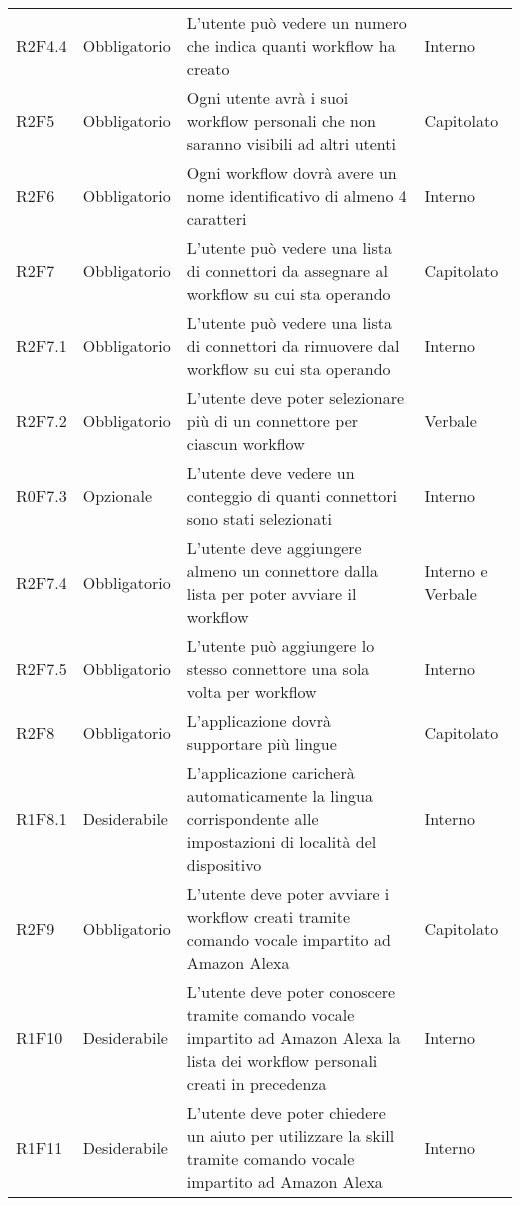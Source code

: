 \begin{center}
\begin{longtable}{  >{\RaggedRight}p{2.5cm}  
						>{\RaggedRight}p{2.1cm} 
						>{\RaggedRight}p{7cm}  
						>{\RaggedRight}p{1.7cm} 
						}
		R2F4.4 & Obbligatorio & L'utente può vedere un numero che indica quanti workflow ha creato                                    & Interno              \\  
		R2F5   & Obbligatorio & Ogni utente avrà i suoi workflow personali che non saranno visibili ad altri utenti                   & Capitolato           \\  
		R2F6   & Obbligatorio & Ogni workflow dovrà avere un nome identificativo di almeno 4 caratteri                                & Interno              \\
		R2F7   & Obbligatorio & L'utente può vedere una lista di connettori da assegnare al workflow su cui sta operando              & Capitolato           \\  
		R2F7.1 & Obbligatorio & L'utente può vedere una lista di connettori da rimuovere dal workflow su cui sta operando             & Interno              \\  
		R2F7.2 & Obbligatorio & L'utente deve poter selezionare più di un connettore per ciascun workflow                             & Verbale              \\  
		R0F7.3 & Opzionale    & L'utente deve vedere un conteggio di quanti connettori sono stati selezionati                         & Interno              \\  
		R2F7.4 & Obbligatorio & L'utente deve aggiungere almeno un connettore dalla lista per poter avviare il workflow               & Interno e Verbale    \\  
		R2F7.5 & Obbligatorio & L'utente può aggiungere lo stesso connettore una sola volta per workflow                                  & Interno              \\  
		R2F8   & Obbligatorio & L'applicazione dovrà supportare più lingue                                                            & Capitolato           \\  
		R1F8.1 & Desiderabile & L'applicazione caricherà automaticamente la lingua corrispondente alle impostazioni di località del dispositivo & Interno              \\
		R2F9   & Obbligatorio	& L'utente deve poter avviare i workflow creati tramite comando vocale impartito ad Amazon Alexa & Capitolato \\
		R1F10	& Desiderabile	& L'utente deve poter conoscere tramite comando vocale impartito ad Amazon Alexa la lista dei workflow personali creati in precedenza	& Interno \\
		R1F11	& Desiderabile	& L'utente deve poter chiedere un aiuto per utilizzare la skill tramite comando vocale impartito ad Amazon Alexa	& Interno \\

\end{longtable}
\end{center}
